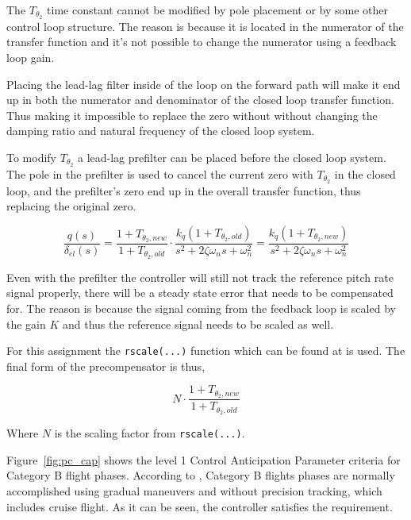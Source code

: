 The $T_{\theta_2}$ time constant cannot be modified by pole placement or by some other control loop structure. The reason is because it is located in the numerator of the transfer function and it's not possible to change the numerator using a feedback loop gain. 

Placing the lead-lag filter inside of the loop on the forward path will make it end up in both the numerator and denominator of the closed loop transfer function. Thus making it impossible to replace the zero without without changing the damping ratio and natural frequency of the closed loop system.

To modify $T_{\theta_2}$ a lead-lag prefilter can be placed before the closed loop system. The pole in the prefilter is used to cancel the current zero with $T_{\theta_2}$ in the closed loop, and the prefilter's zero end up in the overall transfer function, thus replacing the original zero.

\begin{equation}
    \frac{q(s)}{\delta_{el}(s)}=\frac{1+T_{\theta_2,new}}{1+T_{\theta_2,old}} \cdot
        \frac{k_q \left(1+T_{\theta_2,old}\right)}{
        s^2+2\zeta\omega_ns+\omega_n^2}
        =
        \frac{k_q \left(1+T_{\theta_2,new}\right)}{
        s^2+2\zeta\omega_ns+\omega_n^2}
\end{equation}

Even with the prefilter the controller will still not track the reference pitch rate signal properly, there will be a steady state error that needs to be compensated for. The reason is because the signal coming from the feedback loop is scaled by the gain $K$ and thus the reference signal needs to be scaled as well.

For this assignment the \texttt{rscale(...)} function which can be found at \cite{matlabrscale} is used. The final form of the precompensator is thus,

\begin{equation}
    N \cdot \frac{1+T_{\theta_2,new}}{1+T_{\theta_2,old}}
\end{equation}

Where $N$ is the scaling factor from \texttt{rscale(...)}.



Figure~\ref{fig:pc_cap} shows the level 1 Control Anticipation Parameter criteria for Category B flight phases. According to \cite{milstd1797a}, Category B flights phases are normally accomplished using gradual maneuvers and without precision tracking, which includes cruise flight. As it can be seen, the controller satisfies the requirement.

